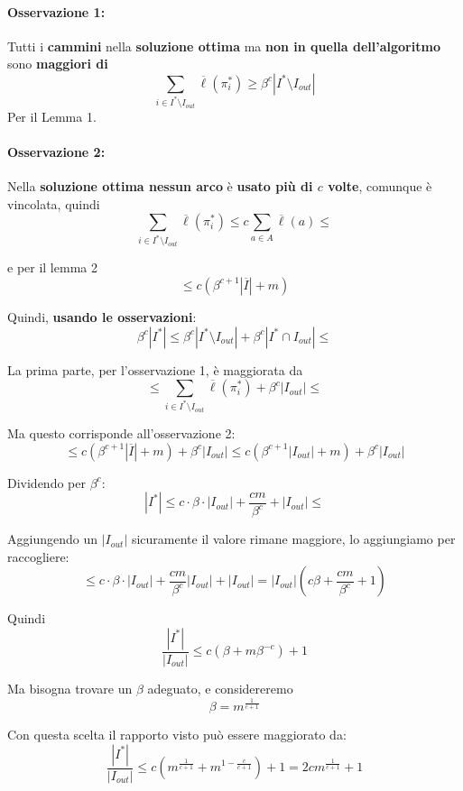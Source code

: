 \paragraph{Osservazione 1:} Tutti i \textbf{cammini} nella \textbf{soluzione ottima} ma \textbf{non in quella dell'algoritmo} sono \textbf{maggiori di}
$$ \sum_{i \in I^\ast \setminus I_{out}} \overline{\ell} (\pi_i^\ast) \geq \beta^c |I^\ast \setminus I_{out}|$$
Per il Lemma 1.\\

\paragraph{Osservazione 2:} Nella \textbf{soluzione ottima nessun arco} è \textbf{usato più di $c$ volte}, comunque è vincolata, quindi
$$ \sum_{i \in I^\ast \setminus I_{out}} \overline{\ell}(\pi_i^\ast) \leq c \sum_{a \in A} \overline{\ell} (a) \leq $$

e per il lemma 2 
$$ \leq c \left( \beta^{c+1}|\overline{I}| + m \right) $$

\nn 
Quindi, \textbf{usando le osservazioni}: 
$$ \beta^c |I^\ast| \leq \beta^c |I^\ast \setminus I_{out}| + \beta^c |I^\ast \cap I_{out}| \leq $$

La prima parte, per l'osservazione 1, è maggiorata da
$$ \leq \sum_{i \in I^\ast \setminus I_{out}} \overline{\ell} (\pi_i^\ast) + \beta^c |I_{out}| \leq $$

Ma questo corrisponde all'osservazione 2:
$$ \leq c \left( \beta^{c+1}|\overline{I}| + m \right) + \beta^c |I_{out}| \leq  c \left( \beta^{c+1}|I_{out}| + m \right) + \beta^c |I_{out}| $$

Dividendo per $\beta^c$:
$$ |I^\ast| \leq c \cdot \beta \cdot |I_{out}| + \frac{cm}{\beta^c} + |I_{out}| \leq $$

Aggiungendo un $|I_{out}|$ sicuramente il valore rimane maggiore, lo aggiungiamo per raccogliere:
$$ \leq c \cdot \beta \cdot |I_{out}| + \frac{cm}{\beta^c} |I_{out}| + |I_{out}| = |I_{out}| \left(c \beta + \frac{cm}{\beta^c} + 1\right) $$

Quindi
$$ \frac{|I^\ast|}{|I_{out}|} \leq c \left(\beta + m \beta^{-c}\right) + 1$$

Ma bisogna trovare un $\beta$ adeguato, e considereremo
$$ \beta = m^{\frac{1}{c+1}}$$

Con questa scelta il rapporto visto può essere maggiorato da:  
$$ \frac{|I^\ast|}{|I_{out}|} \leq c \left(m^{\frac{1}{c+1}} + m^{1-\frac{c}{c+1}}\right) + 1 = 2c m^{\frac{1}{c+1}} + 1 $$

